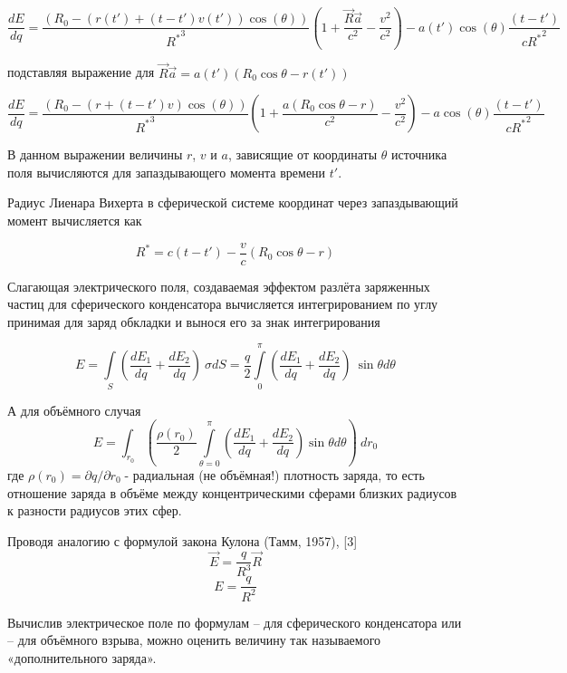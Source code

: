 ﻿\documentclass[12pt, letterpaper]{article}
\begin{document}
$$\frac{dE}{dq}=\frac{\left( {{R}_{0}}-\left( r\left( {{t}'} \right)+\left( t-{t}' \right)v\left( {{t}'} \right) \right)\cos \left( \theta  \right) \right)}{{{R}^{*}}^{3}}\left( 1+\frac{\vec{R}\vec{a}}{{{c}^{2}}}-\frac{{{v}^{2}}}{{{c}^{2}}} \right)-a\left( {{t}'} \right)\cos \left( \theta  \right)\frac{\left( t-{t}' \right)}{c{{R}^{*}}^{2}}$$

подставляя выражение для $\vec{R}\vec{a}=a\left( {{t}'} \right)\left( {{R}_{0}}\cos \theta -r\left( t' \right) \right)$


$$\frac{dE}{dq}=\frac{\left( {{R}_{0}}-\left( r+\left( t-{t}' \right)v \right)\cos \left( \theta  \right) \right)}{{{R}^{*}}^{3}}\left( 1+\frac{a\left( {{R}_{0}}\cos \theta -r \right)}{{{c}^{2}}}-\frac{{{v}^{2}}}{{{c}^{2}}} \right)-a\cos \left( \theta  \right)\frac{\left( t-{t}' \right)}{c{{R}^{*}}^{2}}$$

В данном выражении величины $r$, $v$ и $a$, зависящие от координаты $\theta$ источника поля вычисляются для запаздывающего момента времени $t'$.

Радиус Лиенара Вихерта в сферической системе координат через запаздывающий момент вычисляется как

\[{{R}^{*}}=c\left( t-t' \right)-\frac{v}{c}\left( {{R}_{0}}\cos \theta -r \right)\]

Слагающая электрического поля, создаваемая эффектом разлёта заряженных частиц для сферического конденсатора вычисляется интегрированием по углу  принимая для  заряд обкладки и вынося его за знак интегрирования

	\[E=\int\limits_{S}{\left( \frac{d{{E}_{1}}}{dq}+\frac{d{{E}_{2}}}{dq} \right)\ }\sigma dS=\frac{q}{2}\int\limits_{0}^{\pi }{\left( \frac{d{{E}_{1}}}{dq}+\frac{d{{E}_{2}}}{dq} \right)}\ \sin \theta d\theta \]

А для объёмного случая
	\[E=\int_{{{r}_{0}}}{\left( \frac{\rho \left( {{r}_{0}} \right)}{2}\int\limits_{\theta =0}^{\pi }{\left( \frac{d{{E}_{1}}}{dq}+\frac{d{{E}_{2}}}{dq} \right)\sin \theta d\theta } \right)}\ d{{r}_{0}}\]
где ${\rho \left( {{r}_{0}} \right)=\partial q}/{\partial {{r}_{0}}}\;$- радиальная (не объёмная!) плотность заряда, то есть отношение заряда в объёме между концентрическими сферами близких радиусов к разности радиусов этих сфер.

Проводя аналогию с формулой закона Кулона (Тамм, 1957), [3]
	\[\overrightarrow{E}=\frac{q}{{{R}^{3}}} \overrightarrow{R}\] \[E=\frac{q}{{{R}^{2}}}\]

Вычислив электрическое поле по формулам  – для сферического конденсатора или  – для объёмного взрыва, можно оценить величину так называемого «дополнительного заряда».
\end{document}
